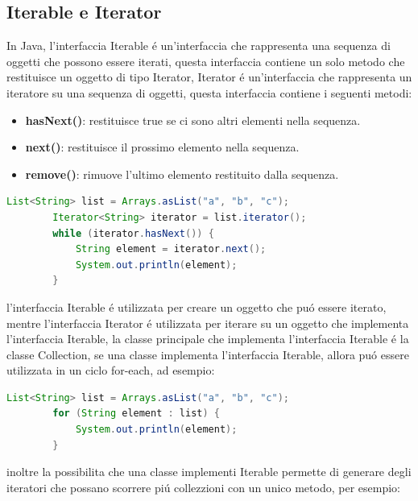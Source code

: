 \documentclass[11pt]{article}
\begin{document}
    \subsection{Iterable e Iterator}
    In Java, l'interfaccia Iterable é un'interfaccia che rappresenta una sequenza di oggetti che possono essere iterati, questa interfaccia contiene un solo metodo che restituisce un oggetto di tipo Iterator,
    Iterator é un'interfaccia che rappresenta un iteratore su una sequenza di oggetti, questa interfaccia contiene i seguenti metodi:
    \begin{itemize}
        \item \textbf{hasNext()}: restituisce true se ci sono altri elementi nella sequenza.
        \item \textbf{next()}: restituisce il prossimo elemento nella sequenza.
        \item \textbf{remove()}: rimuove l'ultimo elemento restituito dalla sequenza.
        \end{itemize}
    \begin{lstlisting}[language=Java]
        List<String> list = Arrays.asList("a", "b", "c");
        Iterator<String> iterator = list.iterator();
        while (iterator.hasNext()) {
            String element = iterator.next();
            System.out.println(element);
        }
    \end{lstlisting}
    l'interfaccia Iterable é utilizzata per creare un oggetto che puó essere iterato, mentre l'interfaccia Iterator é utilizzata per iterare su un oggetto che implementa l'interfaccia Iterable,
    la classe principale che implementa l'interfaccia Iterable é la classe Collection, se una classe implementa l'interfaccia Iterable, allora puó essere utilizzata in un ciclo for-each, ad esempio:
    \begin{lstlisting}[language=Java]
        List<String> list = Arrays.asList("a", "b", "c");
        for (String element : list) {
            System.out.println(element);
        }
    \end{lstlisting}
    inoltre la possibilita che una classe implementi Iterable permette di generare degli iteratori che possano scorrere piú collezzioni con un unico metodo, per esempio:
\end{document}
